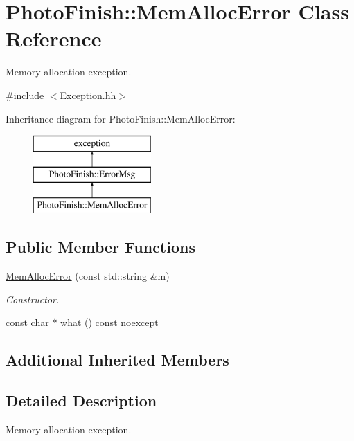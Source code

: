 \hypertarget{class_photo_finish_1_1_mem_alloc_error}{}\section{Photo\+Finish\+:\+:Mem\+Alloc\+Error Class Reference}
\label{class_photo_finish_1_1_mem_alloc_error}


Memory allocation exception.  




{\ttfamily \#include $<$Exception.\+hh$>$}

Inheritance diagram for Photo\+Finish\+:\+:Mem\+Alloc\+Error\+:\begin{figure}[H]
\begin{center}
\leavevmode
\includegraphics[height=3.000000cm]{class_photo_finish_1_1_mem_alloc_error}
\end{center}
\end{figure}
\subsection*{Public Member Functions}
\begin{DoxyCompactItemize}
\item 
\hyperlink{class_photo_finish_1_1_mem_alloc_error_ad9c18ee333d465217ced55e75500e210}{Mem\+Alloc\+Error} (const std\+::string \&m)
\begin{DoxyCompactList}\small\item\em Constructor. \end{DoxyCompactList}\item 
const char $\ast$ \hyperlink{class_photo_finish_1_1_mem_alloc_error_af7d792c61c12e9db04ad6f62520c1e06}{what} () const noexcept
\end{DoxyCompactItemize}
\subsection*{Additional Inherited Members}


\subsection{Detailed Description}
Memory allocation exception. 


